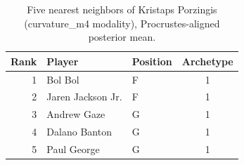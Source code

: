 \begin{table}[htbp]
  \centering\small
  \begin{tabular}{rllc}
    \toprule
    Rank & Player & Position & Archetype \\
    \midrule
    1 & Bol Bol & F & 1 \\
    2 & Jaren Jackson Jr. & F & 1 \\
    3 & Andrew Gaze & G & 1 \\
    4 & Dalano Banton & G & 1 \\
    5 & Paul George & G & 1 \\
    \bottomrule
  \end{tabular}
  \caption{Five nearest neighbors of Kristaps Porzingis (curvature_m4 modality), Procrustes-aligned posterior mean.}
  \label{tab:Kristaps_Porzingis_neighbors_curvature_m4}
\end{table}

